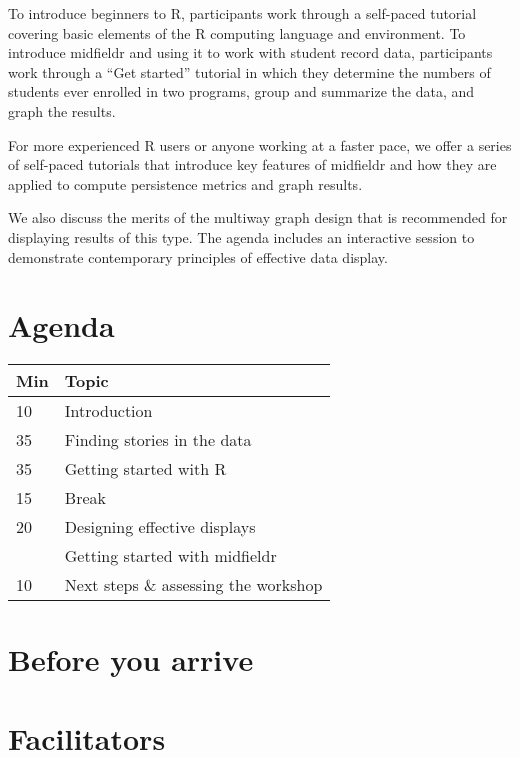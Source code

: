 \documentclass[
]{book}
\begin{document}
To introduce beginners to R, participants work through a self-paced tutorial covering basic elements of the R computing language and environment. To introduce midfieldr and using it to work with student record data, participants work through a ``Get started'' tutorial in which they determine the numbers of students ever enrolled in two programs, group and summarize the data, and graph the results.

For more experienced R users or anyone working at a faster pace, we offer a series of self-paced tutorials that introduce key features of midfieldr and how they are applied to compute persistence metrics and graph results.

We also discuss the merits of the multiway graph design that is recommended for displaying results of this type. The agenda includes an interactive session to demonstrate contemporary principles of effective data display.

\hypertarget{agenda}{%
\section*{Agenda}\label{agenda}}

\begin{tabular}{ll}
\toprule
Min & Topic\\
\midrule
10 & Introduction\\
35 & Finding stories in the data\\
35 & Getting started with R\\
15 & Break\\
20 & Designing effective displays\\
\addlinespace
55 & Getting started with midfieldr\\
10 & Next steps \& assessing the workshop\\
\bottomrule
\end{tabular}

\hypertarget{before-you-arrive}{%
\section*{Before you arrive}\label{before-you-arrive}}

\hypertarget{facilitators}{%
\section*{Facilitators}\label{facilitators}}
\end{document}
